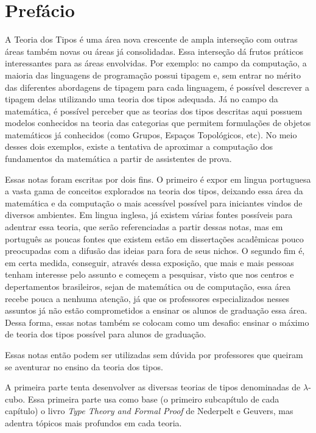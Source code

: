 \documentclass[../main.tex]{subfiles}
\begin{document}
\section{Prefácio}


A Teoria dos Tipos é uma área nova crescente de ampla interseção com outras áreas também novas ou áreas já consolidadas. Essa interseção dá frutos práticos interessantes para as áreas envolvidas. Por exemplo: no campo da computação, a maioria das linguagens de programação possui tipagem e, sem entrar no mérito das diferentes abordagens de tipagem para cada linguagem, é possível descrever a tipagem delas utilizando uma teoria dos tipos adequada. Já no campo da matemática, é possível perceber que as teorias dos tipos descritas aqui possuem modelos conhecidos na teoria das categorias que permitem formulações de objetos matemáticos já conhecidos (como Grupos, Espaços Topológicos, etc). No meio desses dois exemplos, existe a tentativa de aproximar a computação dos fundamentos da matemática a partir de assistentes de prova. 

Essas notas foram escritas por dois fins. O primeiro é expor em lingua portuguesa a vasta gama de conceitos explorados na teoria dos tipos, deixando essa área da matemática e da computação o mais acessível possível para iniciantes vindos de diversos ambientes. Em lingua inglesa, já existem várias fontes possíveis para adentrar essa teoria, que serão referenciadas a partir dessas notas, mas em português as poucas fontes que existem estão em dissertações acadêmicas pouco preocupadas com a difusão das ideias para fora de seus nichos. O segundo fim é, em certa medida, conseguir, através dessa exposição, que mais e mais pessoas tenham interesse pelo assunto e começem a pesquisar, visto que nos centros e depertamentos brasileiros, sejan de matemática ou de computação, essa área recebe pouca a nenhuma atenção, já que os professores especializados nesses assuntos já não estão comprometidos a ensinar os alunos de graduação essa área. Dessa forma, essas notas também se colocam como um desafio: ensinar o máximo de teoria dos tipos possível para alunos de graduação. 

Essas notas então podem ser utilizadas sem dúvida por professores que queiram se aventurar no ensino da teoria dos tipos.

A primeira parte tenta desenvolver as diversas teorias de tipos denominadas de $\lambda$-cubo. Essa primeira parte usa como base (o primeiro subcapítulo de cada capítulo) o livro \emph{Type Theory and Formal Proof} de Nederpelt e Geuvers, mas adentra tópicos mais profundos em cada teoria. 
\end{document}
